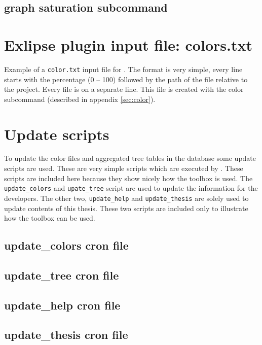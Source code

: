 \begin{minipage}{\textwidth}
	\section{graph saturation subcommand}\label{sec:graph}
\end{minipage}


\chapter{Exlipse plugin input file: colors.txt}
\label{ch:colors.txt}
Example of a \verb|color.txt| input file for . The format is very simple, every line starts with the percentage (0 -- 100) followed by the path of the file relative to the project. Every file is on a separate line. This file is created with the color subcommand (described in appendix \ref{sec:color}).


\chapter{Update scripts}

To update the color files and aggregated tree tables in the database some update scripts are used. These are very simple  scripts which are executed by . These scripts are included here because they show nicely how the toolbox is used. The \verb|update_colors| and \verb|upate_tree| script are used to update the information for the developers. The other two, \verb|update_help| and \verb|update_thesis| are solely used to update contents of this thesis. These two scripts are included only to illustrate how the toolbox can be used.

\section{update\_colors cron file\label{sec:update_colors}}\nopagebreak{}

\section{update\_tree cron file\label{sec:update_tree}}\nopagebreak{}

\section{update\_help cron file\label{sec:update_help}}\nopagebreak{}

\section{update\_thesis cron file\label{sec:update_thesis}}\nopagebreak{}